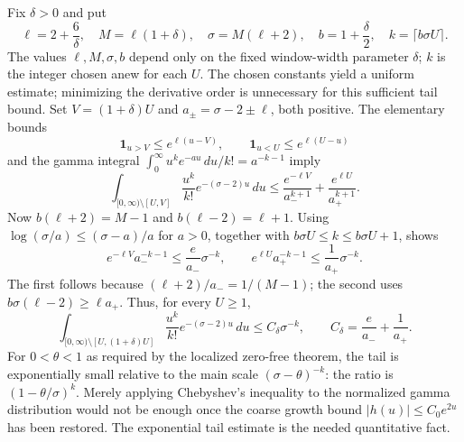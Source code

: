 \documentclass[11pt,openany,oneside]{scrbook}
\theoremstyle{definition}
\theoremstyle{remark}
\begin{document}
Fix $\delta>0$ and put
\[
\ell=2+\frac6\delta,\quad M=\ell(1+\delta),\quad
\sigma=M(\ell+2),\quad b=1+\frac\delta2,\quad
k=\lceil b\sigma U\rceil.
\]
The values $\ell,M,\sigma,b$ depend only on the fixed window-width parameter $\delta$; $k$ is the integer chosen anew for each $U$. The chosen constants yield a uniform estimate; minimizing the derivative order is unnecessary for this sufficient tail bound.  Set $V=(1+\delta)U$ and $a_\pm=\sigma-2\pm\ell$, both positive.  The elementary bounds
\[
\mathbf1_{u>V}\le e^{\ell(u-V)},\qquad
\mathbf1_{u<U}\le e^{\ell(U-u)}
\]
and the gamma integral $\int_0^\infty u^ke^{-au}\,du/k!=a^{-k-1}$ imply
\begin{equation}\label{eq:app-tail}
\int_{[0,\infty)\setminus[U,V]}\frac{u^k}{k!}e^{-(\sigma-2)u}\,du
\le \frac{e^{-\ell V}}{a_-^{k+1}}+\frac{e^{\ell U}}{a_+^{k+1}}.
\end{equation}
Now $b(\ell+2)=M-1$ and $b(\ell-2)=\ell+1$.  Using $\log(\sigma/a)\le(\sigma-a)/a$ for $a>0$, together with $b\sigma U\le k\le b\sigma U+1$, shows
\[
e^{-\ell V}a_-^{-k-1}\le\frac e{a_-}\sigma^{-k},
\qquad e^{\ell U}a_+^{-k-1}\le\frac1{a_+}\sigma^{-k}.
\]
The first follows because $(\ell+2)/a_-=1/(M-1)$; the second uses $b\sigma(\ell-2)\ge\ell a_+$.  Thus, for every $U\ge1$,
\begin{equation}\label{eq:tail-strong}
\int_{[0,\infty)\setminus[U,(1+\delta)U]}
\frac{u^k}{k!}e^{-(\sigma-2)u}\,du
\le C_\delta\sigma^{-k},\qquad
C_\delta=\frac e{a_-}+\frac1{a_+}.
\end{equation}
For $0<\theta<1$ as required by the localized zero-free theorem, the tail is exponentially small relative to the main scale $(\sigma-\theta)^{-k}$: the ratio is $(1-\theta/\sigma)^k$. Merely applying Chebyshev's inequality to the normalized gamma distribution would not be enough once the coarse growth bound $|h(u)|\le C_0e^{2u}$ has been restored. The exponential tail estimate is the needed quantitative fact.
\end{document}
